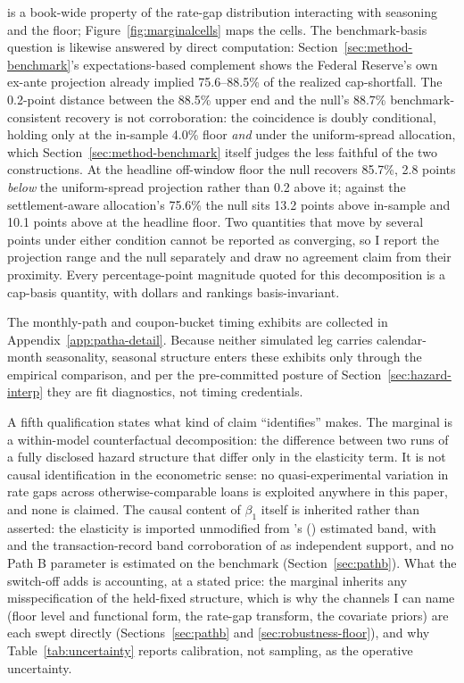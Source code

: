 \documentclass[12pt]{article}
\newcommand{\citepos}[1]{\citeauthor{#1}'s (\citeyear{#1})}
\begin{document}
is a book-wide property of the rate-gap distribution interacting with seasoning and the floor; Figure~\ref{fig:marginalcells} maps the cells. The benchmark-basis question is likewise answered by direct computation: Section~\ref{sec:method-benchmark}'s expectations-based complement shows the Federal Reserve's own ex-ante projection already implied 75.6--88.5\% of the realized cap-shortfall. The 0.2-point distance between the 88.5\% upper end and the null's 88.7\% benchmark-consistent recovery is not corroboration: the coincidence is doubly conditional, holding only at the in-sample 4.0\% floor \emph{and} under the uniform-spread allocation, which Section~\ref{sec:method-benchmark} itself judges the less faithful of the two constructions. At the headline off-window floor the null recovers 85.7\%, 2.8 points \emph{below} the uniform-spread projection rather than 0.2 above it; against the settlement-aware allocation's 75.6\% the null sits 13.2 points above in-sample and 10.1 points above at the headline floor. Two quantities that move by several points under either condition cannot be reported as converging, so I report the projection range and the null separately and draw no agreement claim from their proximity. Every percentage-point magnitude quoted for this decomposition is a cap-basis quantity, with dollars and rankings basis-invariant.

The monthly-path and coupon-bucket timing exhibits are collected in Appendix~\ref{app:patha-detail}. Because neither simulated leg carries calendar-month seasonality, seasonal structure enters these exhibits only through the empirical comparison, and per the pre-committed posture of Section~\ref{sec:hazard-interp} they are fit diagnostics, not timing credentials.

A fifth qualification states what kind of claim ``identifies'' makes. The marginal is a within-model counterfactual decomposition: the difference between two runs of a fully disclosed hazard structure that differ only in the elasticity term. It is not causal identification in the econometric sense: no quasi-experimental variation in rate gaps across otherwise-comparable loans is exploited anywhere in this paper, and none is claimed. The causal content of $\beta_1$ itself is inherited rather than asserted: the elasticity is imported unmodified from \citepos{liebersohn2024} estimated band, with \citet{fonseca2024} and the transaction-record band corroboration of \citet{graybill2026} as independent support, and no Path B parameter is estimated on the benchmark (Section~\ref{sec:pathb}). What the switch-off adds is accounting, at a stated price: the marginal inherits any misspecification of the held-fixed structure, which is why the channels I can name (floor level and functional form, the rate-gap transform, the covariate priors) are each swept directly (Sections~\ref{sec:pathb} and \ref{sec:robustness-floor}), and why Table~\ref{tab:uncertainty} reports calibration, not sampling, as the operative uncertainty.
\end{document}
